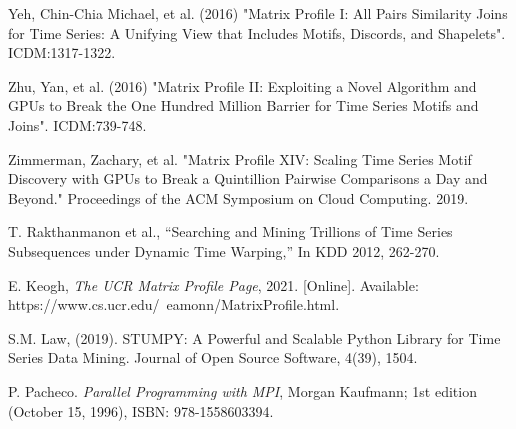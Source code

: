 \documentclass[conference]{IEEEtran}
\begin{document}
\begin{thebibliography}{7}  

 Yeh, Chin-Chia Michael, et al. (2016) "Matrix Profile I: All Pairs Similarity Joins for Time Series: A Unifying View that Includes Motifs, Discords, and Shapelets". ICDM:1317-1322.

 Zhu, Yan, et al. (2016) "Matrix Profile II: Exploiting a Novel Algorithm and GPUs to Break the One Hundred Million Barrier for Time Series Motifs and Joins". ICDM:739-748.

 Zimmerman, Zachary, et al. "Matrix Profile XIV: Scaling Time Series Motif Discovery with GPUs to Break a Quintillion Pairwise Comparisons a Day and Beyond." Proceedings of the ACM Symposium on Cloud Computing. 2019.

 T. Rakthanmanon et al., “Searching and Mining Trillions of Time Series Subsequences under Dynamic Time Warping,” In KDD 2012, 262-270.

 E. Keogh, \emph{The UCR Matrix Profile Page}, 2021. [Online]. Available: https://www.cs.ucr.edu/~eamonn/MatrixProfile.html.

 S.M. Law, (2019). STUMPY: A Powerful and Scalable Python Library for Time Series Data Mining. Journal of Open Source Software, 4(39), 1504.

 P. Pacheco. \emph{Parallel Programming with MPI}, Morgan Kaufmann; 1st edition (October 15, 1996), ISBN: 978-1558603394.

\end{thebibliography}
\end{document}
